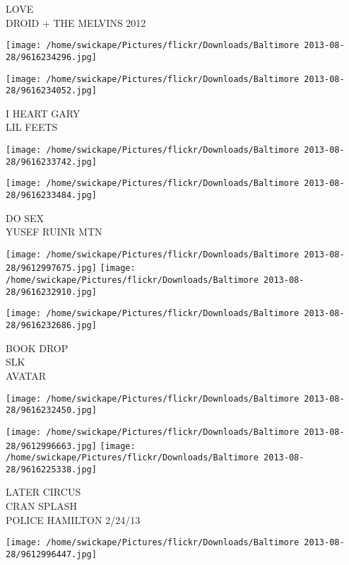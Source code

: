 \documentclass[10pt,letterpaper]{article}
\begin{document}
LOVE\\
DROID + THE MELVINS 2012\\
\pagebreak

\texttt{[image: /home/swickape/Pictures/flickr/Downloads/Baltimore 2013-08-28/9616234296.jpg]}

\vspace{0.25in}
\texttt{[image: /home/swickape/Pictures/flickr/Downloads/Baltimore 2013-08-28/9616234052.jpg]}

I HEART GARY\\
LIL FEETS\\
\pagebreak

\texttt{[image: /home/swickape/Pictures/flickr/Downloads/Baltimore 2013-08-28/9616233742.jpg]}

\vspace{0.25in}
\texttt{[image: /home/swickape/Pictures/flickr/Downloads/Baltimore 2013-08-28/9616233484.jpg]}

DO SEX\\
YUSEF RUINR MTN\\
\pagebreak

\texttt{[image: /home/swickape/Pictures/flickr/Downloads/Baltimore 2013-08-28/9612997675.jpg]}
\texttt{[image: /home/swickape/Pictures/flickr/Downloads/Baltimore 2013-08-28/9616232910.jpg]}

\texttt{[image: /home/swickape/Pictures/flickr/Downloads/Baltimore 2013-08-28/9616232686.jpg]}

BOOK DROP\\
SLK\\
AVATAR\\
\pagebreak

\texttt{[image: /home/swickape/Pictures/flickr/Downloads/Baltimore 2013-08-28/9616232450.jpg]}

\vspace{0.25in}
\texttt{[image: /home/swickape/Pictures/flickr/Downloads/Baltimore 2013-08-28/9612996663.jpg]}
\texttt{[image: /home/swickape/Pictures/flickr/Downloads/Baltimore 2013-08-28/9616225338.jpg]}

LATER CIRCUS\\
CRAN SPLASH\\
POLICE HAMILTON 2/24/13\\
\pagebreak

\texttt{[image: /home/swickape/Pictures/flickr/Downloads/Baltimore 2013-08-28/9612996447.jpg]}
\end{document}
